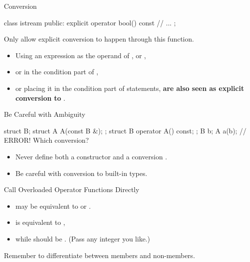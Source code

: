 \begin{frame}[fragile]{ Conversion}
    \begin{cpp}
class istream {
 public:
  explicit operator bool() const {
    // ...
  }
};
    \end{cpp}
    Only allow explicit conversion to happen through this function.
    \begin{itemize}
        \item Using an expression as the operand of ,  or ,
        \item or in the condition part of ,
        \item or placing it in the condition part of  statements, \textbf{are also seen as explicit conversion to }.
    \end{itemize}
\end{frame}

\begin{frame}[fragile]{Be Careful with Ambiguity}
    \begin{cpp}
struct B;
struct A {
  A(const B &);
};
struct B {
  operator A() const;
};
B b;
A a(b); // ERROR! Which conversion?
    \end{cpp}
    \begin{itemize}
        \item Never define both a constructor  and a conversion .
        \item Be careful with conversion to built-in types.
    \end{itemize}
\end{frame}

\begin{frame}[fragile]{Call Overloaded Operator Functions Directly}
    \begin{itemize}
        \item {} may be equivalent to  or .
        \item {} is equivalent to ,
        \item while  should be . (Pass any integer you like.)
    \end{itemize}
    Remember to differentiate between members and non-members.
\end{frame}